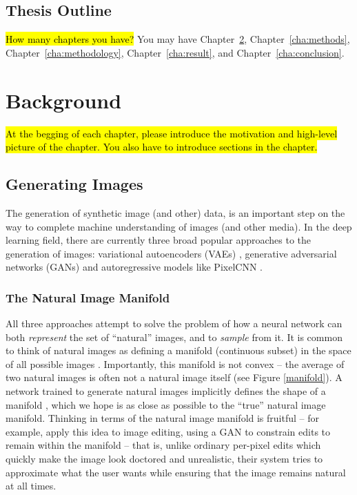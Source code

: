 \documentclass[11pt, a4paper]{book}
\newcommand{\nquote}[1]{``{#1}''}
\begin{document}
\section{Thesis Outline}
\label{sec:outline}
\hl{How many chapters you have?} You may have Chapter~\ref{cha:background},
Chapter~\ref{cha:methods}, Chapter~\ref{cha:methodology},
Chapter~\ref{cha:result}, and Chapter~\ref{cha:conclusion}.




\chapter{Background}
\label{cha:background}
\hl{At the begging of each chapter, please introduce the motivation and high-level
picture of the chapter. You also have to introduce sections in the
chapter.}

\section{Generating Images}

The generation of synthetic image (and other) data, is an important step on the way to complete machine understanding of images (and other media). In the deep learning field, there are currently three broad popular approaches to the generation of images: variational autoencoders (VAEs) \citep{vae}, generative adversarial networks (GANs) \citep{gan} and autoregressive models like PixelCNN \citep{pixelcnn2}.

\subsection{The Natural Image Manifold}

All three approaches attempt to solve the problem of how a neural network can both \emph{represent} the set of \nquote{natural} images, and to \emph{sample} from it. It is common to think of natural images as defining a manifold (continuous subset) in the space of all possible images \citep{manifoldmanipulation,imageinpainting,manifoldmixup}. Importantly, this manifold is not convex -- the average of two natural images is often not a natural image itself (see Figure \ref{manifold}). A network trained to generate natural images implicitly defines the shape of a manifold \citep{manifoldmanipulation}, which we hope is as close as possible to the \nquote{true} natural image manifold. Thinking in terms of the natural image manifold is fruitful -- for example, \citet{manifoldmanipulation} apply this idea to image editing, using a GAN to constrain edits to remain within the manifold -- that is, unlike ordinary per-pixel edits which quickly make the image look doctored and unrealistic, their system tries to approximate what the user wants while ensuring that the image remains natural at all times.
\end{document}
